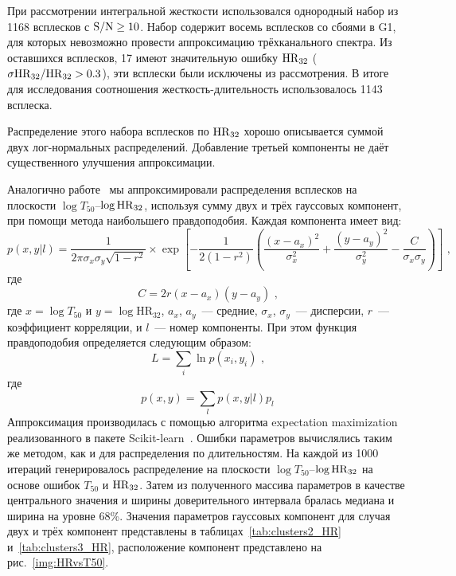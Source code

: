 При рассмотрении интегральной жесткости использовался однородный набор из 1168 
всплесков с ${\mathrm{S/N}} \geq 10$. Набор содержит восемь всплесков со сбоями в G1, 
для которых невозможно провести аппроксимацию трёхканального спектра. 
Из оставшихся всплесков, 17 имеют значительную ошибку ${\mathrm{HR}}_{32}$ 
($\sigma{\mathrm{HR}}_{32}/{\mathrm{HR}}_{32} >0.3$), эти всплески были исключены из рассмотрения. 
В итоге для исследования соотношения жесткость-длительность использовалось 1143 всплеска.

Распределение этого набора всплесков по ${\mathrm{HR}}_{32}$ хорошо описывается суммой двух 
лог-нормальных распределений. Добавление третьей компоненты не даёт существенного 
улучшения аппроксимации. 

Аналогично работе~\citep{Horvath_2006} мы аппроксимировали распределения всплесков на 
плоскости $\log T_{50}$--$\log {\mathrm{HR}}_{32}$, используя сумму двух и трёх 
гауссовых компонент, при помощи метода наибольшего правдоподобия. Каждая компонента имеет вид: 
\begin{equation}
p(x,y| l) = \frac{1}{2\pi \sigma_x \sigma_y \sqrt{1-r^2}} \times 
\exp\left[ -\frac{1}{2(1-r^2)}\left( \frac{(x-a_x)^2}{\sigma_x^2} + 
\frac{(y-a_y)^2}{\sigma_y^2} -\frac{C}{\sigma_x \sigma_y}\right)\right]\mbox{ ,}
\end{equation}
где
\begin{equation}
C = 2r(x-a_x)(y-a_y)\mbox{ ,} \nonumber
\end{equation}
где $x=\log T_{50}$ и $y=\log \mbox{HR}_{32}$,  $a_x$, $a_y$~--- средние, 
$\sigma_x$, $\sigma_y$~--- дисперсии, $r$~--- коэффициент корреляции, 
и $l$~--- номер компоненты. При этом функция правдоподобия определяется следующим образом:
\begin{equation}
L = \sum_i \ln p(x_i, y_i)\mbox{ ,}
\end{equation}
где
\begin{equation}
p(x,y) = \sum_l  p(x, y|l)p_l \nonumber
\end{equation}
Аппроксимация производилась с помощью алгоритма 
expectation maximization~\citep{Horvath_2006, Balazs_2003AA} реализованного в пакете 
Scikit-learn~\citep{scikit-learn}. 
Ошибки параметров вычислялись таким же методом, как и для распределения по длительностям. 
На каждой из 1000 итераций генерировалось распределение на плоскости  
$\log T_{50}$--$\log{\mathrm{HR}}_{32}$ на основе ошибок $T_{50}$ и ${\mathrm{HR}}_{32}$. 
Затем из полученного массива параметров в качестве центрального значения и ширины доверительного 
интервала бралась медиана и ширина на уровне 68\%. Значения параметров гауссовых компонент 
для случая двух и трёх компонент представлены в таблицах~\ref{tab:clusters2_HR} 
и~\ref{tab:clusters3_HR}, расположение компонент представлено на рис.~\ref{img:HRvsT50}. 

